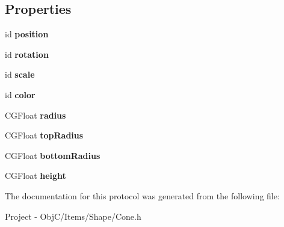 \subsection*{Properties}
\begin{DoxyCompactItemize}
\item 
\hypertarget{protocol_cone_export-p_a6130b53de3b993f1eebb860236fb4a7c}{}id {\bfseries position}\label{protocol_cone_export-p_a6130b53de3b993f1eebb860236fb4a7c}

\item 
\hypertarget{protocol_cone_export-p_a6afc9e4f9f4a03b2b9ea7547283ced6a}{}id {\bfseries rotation}\label{protocol_cone_export-p_a6afc9e4f9f4a03b2b9ea7547283ced6a}

\item 
\hypertarget{protocol_cone_export-p_aa2b0ee5856584a79233f3c18febfd8f7}{}id {\bfseries scale}\label{protocol_cone_export-p_aa2b0ee5856584a79233f3c18febfd8f7}

\item 
\hypertarget{protocol_cone_export-p_a77c05715fbf152899dff4b54b688eb93}{}id {\bfseries color}\label{protocol_cone_export-p_a77c05715fbf152899dff4b54b688eb93}

\item 
\hypertarget{protocol_cone_export-p_a4a8af693e99c20266c04064e5a7ed4de}{}C\+G\+Float {\bfseries radius}\label{protocol_cone_export-p_a4a8af693e99c20266c04064e5a7ed4de}

\item 
\hypertarget{protocol_cone_export-p_a19d9c91e0765367c2b867eb438c1a0c3}{}C\+G\+Float {\bfseries top\+Radius}\label{protocol_cone_export-p_a19d9c91e0765367c2b867eb438c1a0c3}

\item 
\hypertarget{protocol_cone_export-p_adf1df662ca359be5801ea2c231f157dd}{}C\+G\+Float {\bfseries bottom\+Radius}\label{protocol_cone_export-p_adf1df662ca359be5801ea2c231f157dd}

\item 
\hypertarget{protocol_cone_export-p_ac0db1fcc8db28474a234dc24d626be71}{}C\+G\+Float {\bfseries height}\label{protocol_cone_export-p_ac0db1fcc8db28474a234dc24d626be71}

\end{DoxyCompactItemize}


The documentation for this protocol was generated from the following file\+:\begin{DoxyCompactItemize}
\item 
Project -\/ Obj\+C/\+Items/\+Shape/Cone.\+h\end{DoxyCompactItemize}
